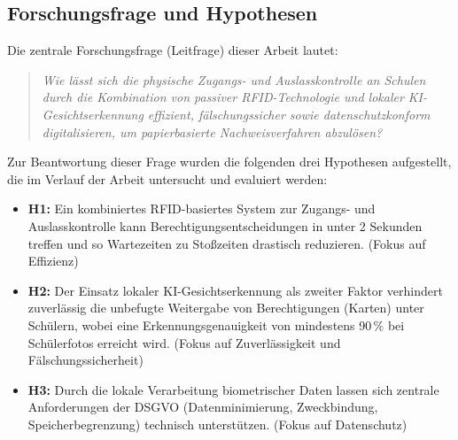 \subsection{Forschungsfrage und Hypothesen} \label{subsec:forschungsfrage}
Die zentrale Forschungsfrage (Leitfrage) dieser Arbeit lautet:
\begin{quote} \textit{Wie lässt sich die physische Zugangs- und Auslasskontrolle an Schulen durch die Kombination von passiver RFID-Technologie und lokaler KI-Gesichtserkennung effizient, fälschungssicher sowie datenschutzkonform digitalisieren, um papierbasierte Nachweisverfahren abzulösen?} \end{quote}
Zur Beantwortung dieser Frage wurden die folgenden drei Hypothesen aufgestellt, die im Verlauf der Arbeit untersucht und evaluiert werden:
\begin{itemize}
    \item \textbf{H1:} Ein kombiniertes RFID-basiertes System zur Zugangs- und Auslasskontrolle kann Berechtigungsentscheidungen in unter 2 Sekunden treffen und so Wartezeiten zu Stoßzeiten drastisch reduzieren. (Fokus auf Effizienz)
    \item \textbf{H2:} Der Einsatz lokaler KI-Gesichtserkennung als zweiter Faktor verhindert zuverlässig die unbefugte Weitergabe von Berechtigungen (Karten) unter Schülern, wobei eine Erkennungsgenauigkeit von mindestens 90\,\% bei Schülerfotos erreicht wird. (Fokus auf Zuverlässigkeit und Fälschungssicherheit) 
    \item \textbf{H3:} Durch die lokale Verarbeitung biometrischer Daten lassen sich zentrale Anforderungen der DSGVO (Datenminimierung, Zweckbindung, Speicherbegrenzung) technisch unterstützen. (Fokus auf Datenschutz) \autocite{dsgvo2016}
\end{itemize}
